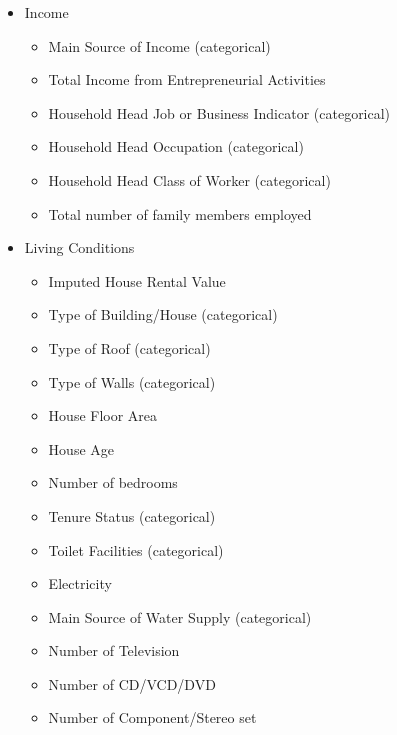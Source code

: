 \documentclass{article}
\begin{document}
\begin{itemize}
\begin{multicols}{2}
\begin{itemize}
        \item Education Expenditure
        \item Miscellaneous Goods and Services Expenditure
        \item Special Occasions Expenditure
        \item Crop Farming and Gardening expenses
      \end{itemize}
    \end{multicols}
  \item Income
    \begin{multicols}{2}
      \begin{itemize}
        \item Main Source of Income (categorical)
        \item Total Income from Entrepreneurial Activities
        \item Household Head Job or Business Indicator (categorical)
        \item Household Head Occupation (categorical)
        \item Household Head Class of Worker (categorical)
        \item Total number of family members employed
      \end{itemize}
    \end{multicols}
  \item Living Conditions
    \begin{multicols}{2}
      \begin{itemize}
        \item Imputed House Rental Value
        \item Type of Building/House (categorical)
        \item Type of Roof (categorical)
        \item Type of Walls (categorical)
        \item House Floor Area
        \item House Age
        \item Number of bedrooms
        \item Tenure Status (categorical)
        \item Toilet Facilities (categorical)
        \item Electricity
        \item Main Source of Water Supply (categorical)
        \item Number of Television
        \item Number of CD/VCD/DVD
        \item Number of Component/Stereo set

\end{itemize}
\end{multicols}
\end{itemize}
\end{document}
